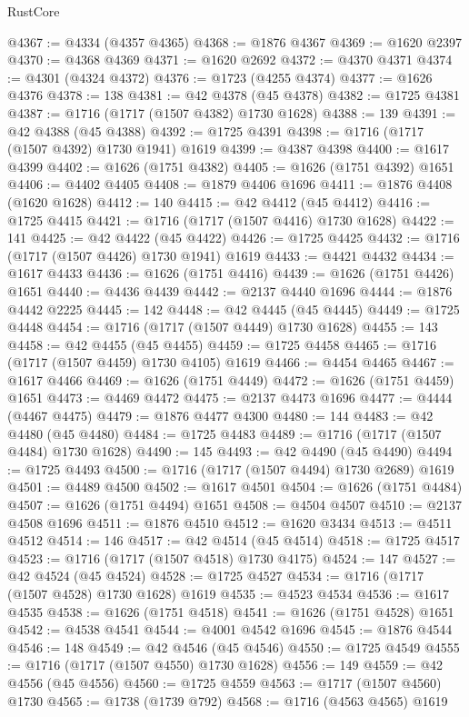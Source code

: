 \begin{lexlean}{RustCore}
\begin{coremodule}
@4367 := @4334 (@4357 @4365)
@4368 := @1876 @4367
@4369 := @1620 @2397
@4370 := @4368 @4369
@4371 := @1620 @2692
@4372 := @4370 @4371
@4374 := @4301 (@4324 @4372)
@4376 := @1723 (@4255 @4374)
@4377 := @1626 @4376
@4378 := 138
@4381 := @42 @4378 (@45 @4378)
@4382 := @1725 @4381
@4387 := @1716 (@1717 (@1507 @4382) @1730 @1628)
@4388 := 139
@4391 := @42 @4388 (@45 @4388)
@4392 := @1725 @4391
@4398 := @1716 (@1717 (@1507 @4392) @1730 @1941) @1619
@4399 := @4387 @4398
@4400 := @1617 @4399
@4402 := @1626 (@1751 @4382)
@4405 := @1626 (@1751 @4392) @1651
@4406 := @4402 @4405
@4408 := @1879 @4406 @1696
@4411 := @1876 @4408 (@1620 @1628)
@4412 := 140
@4415 := @42 @4412 (@45 @4412)
@4416 := @1725 @4415
@4421 := @1716 (@1717 (@1507 @4416) @1730 @1628)
@4422 := 141
@4425 := @42 @4422 (@45 @4422)
@4426 := @1725 @4425
@4432 := @1716 (@1717 (@1507 @4426) @1730 @1941) @1619
@4433 := @4421 @4432
@4434 := @1617 @4433
@4436 := @1626 (@1751 @4416)
@4439 := @1626 (@1751 @4426) @1651
@4440 := @4436 @4439
@4442 := @2137 @4440 @1696
@4444 := @1876 @4442 @2225
@4445 := 142
@4448 := @42 @4445 (@45 @4445)
@4449 := @1725 @4448
@4454 := @1716 (@1717 (@1507 @4449) @1730 @1628)
@4455 := 143
@4458 := @42 @4455 (@45 @4455)
@4459 := @1725 @4458
@4465 := @1716 (@1717 (@1507 @4459) @1730 @4105) @1619
@4466 := @4454 @4465
@4467 := @1617 @4466
@4469 := @1626 (@1751 @4449)
@4472 := @1626 (@1751 @4459) @1651
@4473 := @4469 @4472
@4475 := @2137 @4473 @1696
@4477 := @4444 (@4467 @4475)
@4479 := @1876 @4477 @4300
@4480 := 144
@4483 := @42 @4480 (@45 @4480)
@4484 := @1725 @4483
@4489 := @1716 (@1717 (@1507 @4484) @1730 @1628)
@4490 := 145
@4493 := @42 @4490 (@45 @4490)
@4494 := @1725 @4493
@4500 := @1716 (@1717 (@1507 @4494) @1730 @2689) @1619
@4501 := @4489 @4500
@4502 := @1617 @4501
@4504 := @1626 (@1751 @4484)
@4507 := @1626 (@1751 @4494) @1651
@4508 := @4504 @4507
@4510 := @2137 @4508 @1696
@4511 := @1876 @4510
@4512 := @1620 @3434
@4513 := @4511 @4512
@4514 := 146
@4517 := @42 @4514 (@45 @4514)
@4518 := @1725 @4517
@4523 := @1716 (@1717 (@1507 @4518) @1730 @4175)
@4524 := 147
@4527 := @42 @4524 (@45 @4524)
@4528 := @1725 @4527
@4534 := @1716 (@1717 (@1507 @4528) @1730 @1628) @1619
@4535 := @4523 @4534
@4536 := @1617 @4535
@4538 := @1626 (@1751 @4518)
@4541 := @1626 (@1751 @4528) @1651
@4542 := @4538 @4541
@4544 := @4001 @4542 @1696
@4545 := @1876 @4544
@4546 := 148
@4549 := @42 @4546 (@45 @4546)
@4550 := @1725 @4549
@4555 := @1716 (@1717 (@1507 @4550) @1730 @1628)
@4556 := 149
@4559 := @42 @4556 (@45 @4556)
@4560 := @1725 @4559
@4563 := @1717 (@1507 @4560) @1730
@4565 := @1738 (@1739 @792)
@4568 := @1716 (@4563 @4565) @1619

\end{coremodule}
\end{lexlean}
